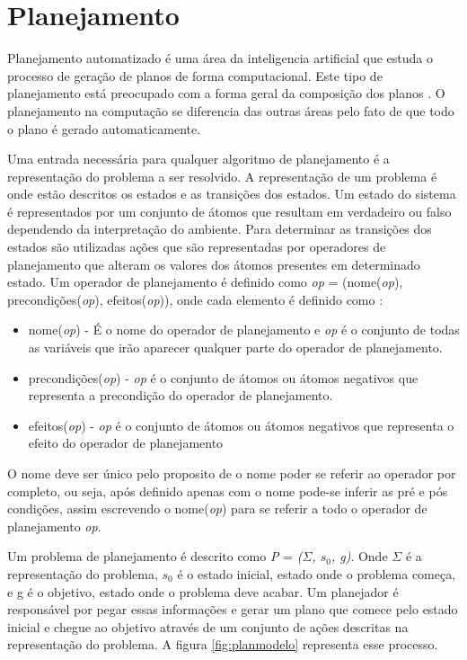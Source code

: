 \chapter{\label{chap:planejamento}Planejamento}

Planejamento automatizado é uma área da inteligencia artificial que estuda o processo de geração de planos de forma computacional. Este tipo de planejamento está preocupado com a forma geral da composição dos planos \cite{ghallab2004automated}. O planejamento na computação se diferencia das outras áreas pelo fato de que todo o plano é gerado automaticamente. 

Uma entrada necessária para qualquer algoritmo de planejamento é a representação do problema a ser resolvido. A representação de um problema é onde estão descritos os estados e as transições dos estados. Um estado do sistema é representados por um conjunto de átomos que resultam em verdadeiro ou falso dependendo da interpretação do ambiente. Para determinar as transições dos estados são utilizadas ações que são  representadas por operadores de planejamento que alteram os valores dos átomos presentes em determinado estado. Um operador de planejamento é definido como \textit{op} = (nome(\textit{op}), precondições(\textit{op}), efeitos(\textit{op})), onde cada elemento é definido como \cite{ghallab2004automated}: 

\begin{itemize}
	\item nome(\textit{op}) - É o nome do operador de planejamento e \textit{op} é o conjunto de todas as variáveis que irão aparecer qualquer parte do operador de planejamento.  
	\item precondições(\textit{op}) - \textit{op} é o conjunto de átomos ou átomos negativos que representa a precondição do operador de planejamento. 
	\item efeitos(\textit{op}) - \textit{op} é o conjunto de átomos ou átomos negativos que representa o efeito do operador de planejamento
\end{itemize}

O nome deve ser único pelo proposito de o nome poder se referir ao operador por completo, ou seja, após definido apenas com o nome pode-se inferir as pré e pós condições, assim escrevendo o nome(\textit{op}) para se referir a todo o operador de planejamento \textit{op}. 

Um problema de planejamento é descrito como \textit{P} = \textit{($\Sigma$, $s_{0}$, g)}. Onde $\Sigma$ é a representação do problema, $s_{0}$ é o estado inicial, estado onde o problema começa, e g é o objetivo, estado onde o problema deve acabar. Um planejador é responsável por pegar essas informações e gerar um plano que comece pelo estado inicial e chegue ao objetivo através de um conjunto de ações descritas na representação do problema. A figura \ref{fig:planmodelo} representa esse processo.

